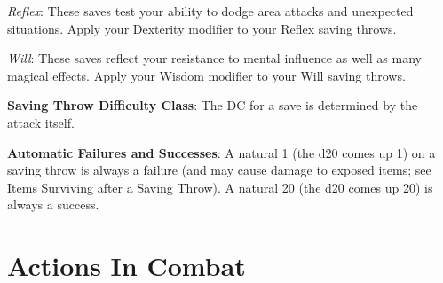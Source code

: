 \textit{Reflex}: These saves test your ability to dodge area attacks and unexpected situations. Apply your Dexterity modifier to your Reflex saving throws. 
				
\textit{Will}: These saves reflect your resistance to mental influence as well as many magical effects. Apply your Wisdom modifier to your Will saving throws.
				
\textbf{Saving Throw Difficulty Class}: The DC for a save is determined by the attack itself.
				
\textbf{Automatic Failures and Successes}: A natural 1 (the d20 comes up 1) on a saving throw is always a failure (and may cause damage to exposed items; see Items Surviving after a Saving Throw). A natural 20 (the d20 comes up 20) is always a success.
				
\section{Actions In Combat}

